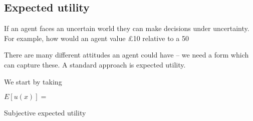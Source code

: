 
\subsection{Expected utility}

If an agent faces an uncertain world they can make decisions under uncertainty. For example, how would an agent value £10 relative to a 50%

There are many different attitudes an agent could have – we need a form which can capture these. A standard approach is expected utility.

We start by taking 

\(E[u(x)]=\)

Subjective expected utility

